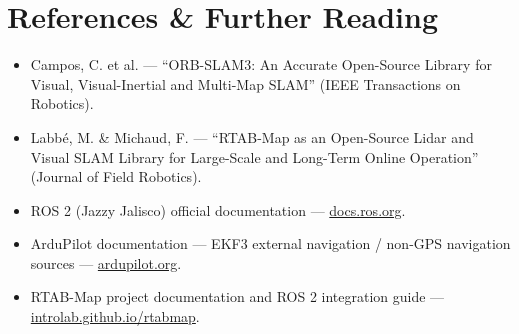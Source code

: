 \documentclass[11pt,a4paper]{article}
\begin{document}
\section{References \& Further Reading}
\begin{itemize}
    \item Campos, C. et al. --- ``ORB-SLAM3: An Accurate Open-Source Library for Visual, Visual-Inertial and Multi-Map SLAM'' (IEEE Transactions on Robotics).
    \item Labbé, M. \& Michaud, F. --- ``RTAB-Map as an Open-Source Lidar and Visual SLAM Library for Large-Scale and Long-Term Online Operation'' (Journal of Field Robotics).
    \item ROS 2 (Jazzy Jalisco) official documentation --- \url{docs.ros.org}.
    \item ArduPilot documentation --- EKF3 external navigation / non-GPS navigation sources --- \url{ardupilot.org}.
    \item RTAB-Map project documentation and ROS 2 integration guide --- \url{introlab.github.io/rtabmap}.
\end{itemize}
\end{document}
